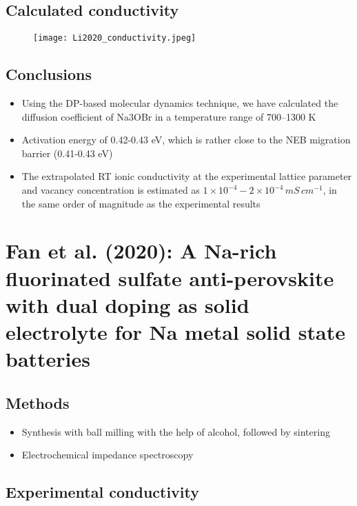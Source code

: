 \documentclass[10pt,a4paper, titlepage]{article}
\begin{document}
\subsection{Calculated conductivity}

\begin{figure}[H]
\centering
\texttt{[image: Li2020\_conductivity.jpeg]}
\end{figure}

\subsection{Conclusions}

\begin{itemize}
  \item Using the DP-based molecular dynamics technique, we have calculated the diffusion coefficient of Na3OBr in a temperature range of 700–1300 K
  \item Activation energy of 0.42-0.43 eV, which is rather close to the NEB migration barrier (0.41-0.43 eV)
  \item The extrapolated RT ionic conductivity at the experimental lattice parameter and vacancy concentration is estimated as $1 \times 10^{-4} - 2 \times 10^{-4} \, mS \, cm^{-1}$, in the same order of magnitude as the experimental results
\end{itemize}

\section{Fan et al. (2020): A Na-rich fluorinated sulfate anti-perovskite with dual doping as solid electrolyte for Na metal solid state batteries}

\subsection{Methods}

\begin{itemize}
  \item Synthesis with ball milling with the help of alcohol, followed by sintering
  \item Electrochemical impedance spectroscopy
\end{itemize}

\subsection{Experimental conductivity}
\end{document}
